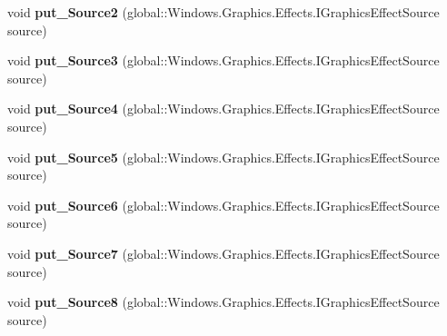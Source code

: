 \begin{DoxyCompactItemize}
void {\bfseries put\+\_\+\+Source2} (global\+::\+Windows.\+Graphics.\+Effects.\+I\+Graphics\+Effect\+Source source)
\item 
\mbox{\label{class_microsoft_1_1_graphics_1_1_canvas_1_1_effects_1_1_pixel_shader_effect_a72869706f81ca72d8591e1527b759287}} 
void {\bfseries put\+\_\+\+Source3} (global\+::\+Windows.\+Graphics.\+Effects.\+I\+Graphics\+Effect\+Source source)
\item 
\mbox{\label{class_microsoft_1_1_graphics_1_1_canvas_1_1_effects_1_1_pixel_shader_effect_a8d929c3ec3f4514d7bda4e4f89ef953e}} 
void {\bfseries put\+\_\+\+Source4} (global\+::\+Windows.\+Graphics.\+Effects.\+I\+Graphics\+Effect\+Source source)
\item 
\mbox{\label{class_microsoft_1_1_graphics_1_1_canvas_1_1_effects_1_1_pixel_shader_effect_a04717819937fb9526403e2c9eb6ad47d}} 
void {\bfseries put\+\_\+\+Source5} (global\+::\+Windows.\+Graphics.\+Effects.\+I\+Graphics\+Effect\+Source source)
\item 
\mbox{\label{class_microsoft_1_1_graphics_1_1_canvas_1_1_effects_1_1_pixel_shader_effect_ad1d4080461aa49660a472c7df8a582d7}} 
void {\bfseries put\+\_\+\+Source6} (global\+::\+Windows.\+Graphics.\+Effects.\+I\+Graphics\+Effect\+Source source)
\item 
\mbox{\label{class_microsoft_1_1_graphics_1_1_canvas_1_1_effects_1_1_pixel_shader_effect_ae12ac7e6d753124282e019e9928f06f5}} 
void {\bfseries put\+\_\+\+Source7} (global\+::\+Windows.\+Graphics.\+Effects.\+I\+Graphics\+Effect\+Source source)
\item 
\mbox{\label{class_microsoft_1_1_graphics_1_1_canvas_1_1_effects_1_1_pixel_shader_effect_a3ff7b2ed79f8b8c5da3a4db406e6586f}} 
void {\bfseries put\+\_\+\+Source8} (global\+::\+Windows.\+Graphics.\+Effects.\+I\+Graphics\+Effect\+Source source)
\item 

\end{DoxyCompactItemize}
